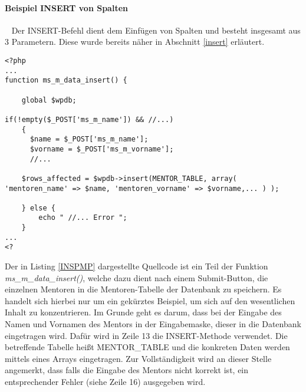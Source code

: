\paragraph{Beispiel INSERT von Spalten}\ \newline
Der INSERT-Befehl dient dem Einfügen von Spalten und besteht insgesamt aus 3 Parametern. Diese wurde bereits näher in Abschnitt \ref{insert} erläutert. 
\begin{lstlisting}
<?php
...
function ms_m_data_insert() {

	global $wpdb;

if(!empty($_POST['ms_m_name']) && //...)
	{		
	  $name = $_POST['ms_m_name']; 
	  $vorname = $_POST['ms_m_vorname']; 
	  //...
	
	$rows_affected = $wpdb->insert(MENTOR_TABLE, array( 'mentoren_name' => $name, 'mentoren_vorname' => $vorname,... ) );
	
	} else {
		echo " //... Error ";
	}
...
<?
\end{lstlisting}
Der in Listing \ref{INSPMP} dargestellte Quellcode ist ein Teil der Funktion \emph{ms\_m\_data\_insert()}, welche dazu dient nach einem Submit-Button, die einzelnen Mentoren in die Mentoren-Tabelle der Datenbank zu speichern. Es handelt sich hierbei nur um ein gekürztes Beispiel, um sich auf den wesentlichen Inhalt zu konzentrieren. \newline
Im Grunde geht es darum, dass bei der Eingabe des Namen und Vornamen des Mentors in der Eingabemaske, dieser in die Datenbank eingetragen wird. \newline
Dafür wird in Zeile 13 die INSERT-Methode verwendet. Die betreffende Tabelle heißt MENTOR\_TABLE und die konkreten Daten werden mittels eines Arrays eingetragen. \newline
Zur Vollständigkeit wird an dieser Stelle angemerkt, dass falls die Eingabe des Mentors nicht korrekt ist, ein entsprechender Fehler (siehe Zeile 16) ausgegeben wird.
